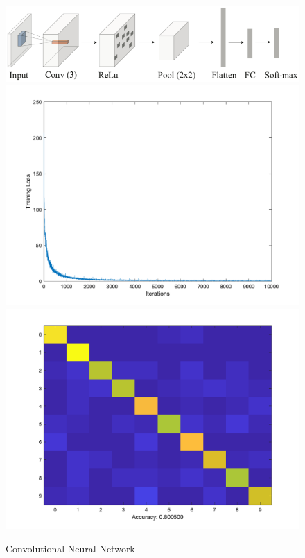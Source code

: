 \documentclass[letter, 10pt]{article}
\begin{document}
\begin{figure}[H]
        \centering
        \includegraphics[width=\textwidth]{HW4/RESULT/CNN.png}
    \endminipage\hfill
        \centering
        \includegraphics[width=1.1\textwidth]{HW4/RESULT/SLP_linear_loss.png}
    \endminipage\hfill
        \centering
        \includegraphics[width=1.1\textwidth]{HW4/RESULT/SLPLINEAR_CONFUSION.png}
    \endminipage\hfill
    \caption{Convolutional Neural Network}
\end{figure}
\end{document}
